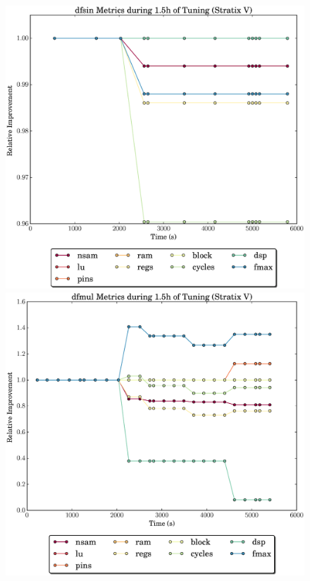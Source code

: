 \documentclass[12pt, a4paper]{article}
\begin{document}
\begin{figure}[htpb]
    \begin{minipage}{.48\textwidth}
        \includegraphics[scale=.29]{dfsin_all_5400_chstone_StratixV}
    \end{minipage}%
    \hfill
    \begin{minipage}{.48\textwidth}
        \includegraphics[scale=.29]{dfmul_all_5400_chstone_StratixV}
    \end{minipage}%


\end{figure}
\end{document}
